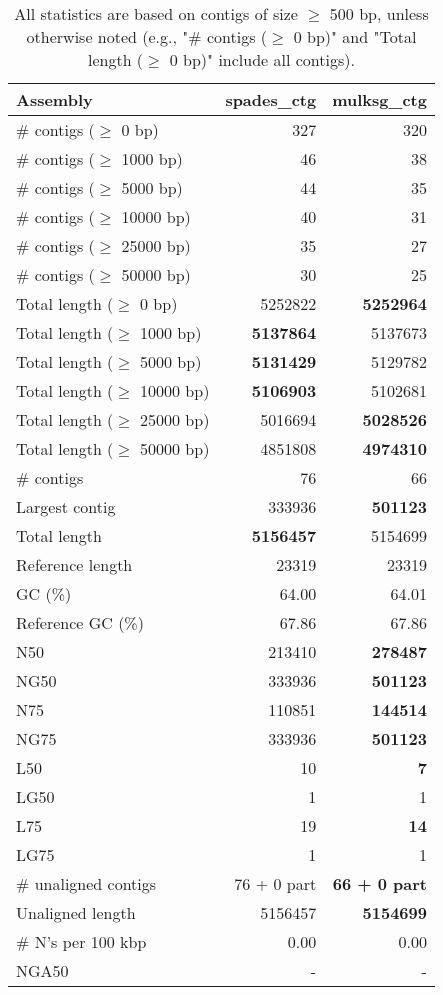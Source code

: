 \documentclass[12pt,a4paper]{article}
\begin{document}
\begin{table}[ht]
\begin{center}
\caption{All statistics are based on contigs of size $\geq$ 500 bp, unless otherwise noted (e.g., "\# contigs ($\geq$ 0 bp)" and "Total length ($\geq$ 0 bp)" include all contigs).}
\begin{tabular}{|l*{2}{|r}|}
\hline
Assembly & spades\_ctg & mulksg\_ctg \\ \hline
\# contigs ($\geq$ 0 bp) & 327 & 320 \\ \hline
\# contigs ($\geq$ 1000 bp) & 46 & 38 \\ \hline
\# contigs ($\geq$ 5000 bp) & 44 & 35 \\ \hline
\# contigs ($\geq$ 10000 bp) & 40 & 31 \\ \hline
\# contigs ($\geq$ 25000 bp) & 35 & 27 \\ \hline
\# contigs ($\geq$ 50000 bp) & 30 & 25 \\ \hline
Total length ($\geq$ 0 bp) & 5252822 & {\bf 5252964} \\ \hline
Total length ($\geq$ 1000 bp) & {\bf 5137864} & 5137673 \\ \hline
Total length ($\geq$ 5000 bp) & {\bf 5131429} & 5129782 \\ \hline
Total length ($\geq$ 10000 bp) & {\bf 5106903} & 5102681 \\ \hline
Total length ($\geq$ 25000 bp) & 5016694 & {\bf 5028526} \\ \hline
Total length ($\geq$ 50000 bp) & 4851808 & {\bf 4974310} \\ \hline
\# contigs & 76 & 66 \\ \hline
Largest contig & 333936 & {\bf 501123} \\ \hline
Total length & {\bf 5156457} & 5154699 \\ \hline
Reference length & 23319 & 23319 \\ \hline
GC (\%) & 64.00 & 64.01 \\ \hline
Reference GC (\%) & 67.86 & 67.86 \\ \hline
N50 & 213410 & {\bf 278487} \\ \hline
NG50 & 333936 & {\bf 501123} \\ \hline
N75 & 110851 & {\bf 144514} \\ \hline
NG75 & 333936 & {\bf 501123} \\ \hline
L50 & 10 & {\bf 7} \\ \hline
LG50 & 1 & 1 \\ \hline
L75 & 19 & {\bf 14} \\ \hline
LG75 & 1 & 1 \\ \hline
\# unaligned contigs & 76 + 0 part & {\bf 66 + 0 part} \\ \hline
Unaligned length & 5156457 & {\bf 5154699} \\ \hline
\# N's per 100 kbp & 0.00 & 0.00 \\ \hline
NGA50 & - & - \\ \hline
\end{tabular}
\end{center}
\end{table}
\end{document}
